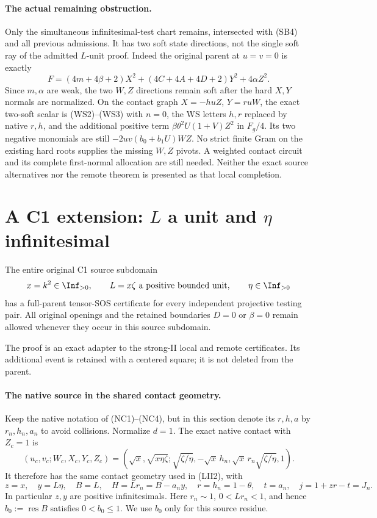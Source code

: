\paragraph{The actual remaining obstruction.}
Only the simultaneous infinitesimal-test chart remains, intersected
with (SB4) and all previous admissions. It has two soft state
directions, not the single soft ray of the admitted $L$-unit proof.
Indeed the original parent at $u=v=0$ is exactly
\[
 F= (4m+4\beta+2)X^2+(4C+4A+4D+2)Y^2+4\alpha Z^2. \tag{SB13}
\]
Since $m,\alpha$ are weak, the two $W,Z$ directions remain soft
after the hard $X,Y$ normals are normalized. On the contact graph
$X=-huZ$, $Y=ruW$, the exact two-soft scalar is (WS2)--(WS3)
with $n=0$, the WS letters $h,r$ replaced by native $r,h$, and
the additional positive term
$\beta\theta^2U(1+V)Z^2$ in $F_g/4$. Its two negative
monomials are still $-2uv(b_0+b_1U)WZ$. No strict finite Gram
on the existing hard roots supplies the missing $W,Z$ pivots.
A weighted contact circuit and its complete first-normal allocation
are still needed. Neither the exact source alternatives nor the
remote theorem is presented as that local completion.


\section{\texorpdfstring{A C1 extension: $L$ a unit and $\eta$ infinitesimal}{A C1 extension: L a unit and eta infinitesimal}}
\label{component:p080aa62de16d}

\label{p080aa62de16d:sec:r7-c1-L-unit-eta-small}

\begin{theorem}
The entire original C1 source subdomain
\[
 x=k^2\in\Inf_{>0},\qquad L=x\zeta\text{ a positive bounded unit},
 \qquad \eta\in\Inf_{>0}
\]
has a full-parent tensor-SOS certificate for every independent
projective testing pair.  All original openings and the retained
boundaries $D=0$ or $\beta=0$ remain allowed whenever they occur
in this source subdomain.
\end{theorem}

The proof is an exact adapter to the strong-II local and remote
certificates.  Its additional event is retained with a centered
square; it is not deleted from the parent.

\paragraph{The native source in the shared contact geometry.}
Keep the native notation of (NC1)--(NC4), but in this section denote
its $r,h,a$ by $r_n,h_n,a_n$ to avoid collisions.  Normalize $d=1$.
The exact native contact with $Z_c=1$ is
\[
 (u_c,v_c;W_c,X_c,Y_c,Z_c)
 =\left(\sqrt x,\sqrt{x\eta\zeta};
 \sqrt{\zeta/\eta},-\sqrt x\,h_n,
 \sqrt x\,r_n\sqrt{\zeta/\eta},1\right).
\]
It therefore has the same contact geometry used in (LII2), with
\[
 z=x,\quad y=L\eta,\quad B=L,\quad H=Lr_n=B-a_ny,
 \quad r=h_n=1-\theta,\quad t=a_n,\quad
 j=1+zr-t=J_n.                                           \tag{LC1}
\]
In particular $z,y$ are positive infinitesimals.  Here $r_n\sim1$,
$0<Lr_n<1$, and hence $b_0:=\operatorname{res}B$ satisfies
$0<b_0\le1$.  We use $b_0$ only for this source residue.

